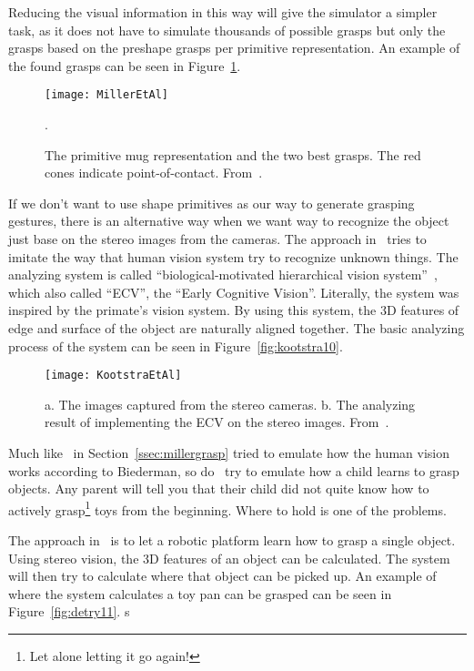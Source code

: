 Reducing the visual information in this way will give the simulator a simpler task,
as it does not have to simulate thousands of possible grasps but only the grasps based on the preshape grasps per primitive representation.
An example of the found grasps can be seen in Figure~\ref{fig:miller6}.

\begin{figure}
	\centering
	\texttt{[image: MillerEtAl]}
	\caption{The primitive mug representation and the two best grasps. The red cones indicate point-of-contact. From~\cite{miller}.}
\label{fig:miller6}.
\end{figure}

If we don’t want to use shape primitives as our way to generate grasping gestures, there is an alternative way when we want way to recognize the object just base on the stereo images from the cameras. The approach in~\cite{kootstra} tries to imitate the way that human vision system try to recognize unknown things. The analyzing system is called “biological-motivated hierarchical vision system”~\cite{pugeault}, which also called “ECV”, the “Early Cognitive Vision”. Literally, the system was inspired by the primate’s vision system. By using this system, the 3D features of edge and surface of the object are naturally aligned together. The basic analyzing process of the system can be seen in Figure~\vref{fig:kootstra10}. 

\begin{figure}
	\centering
	\texttt{[image: KootstraEtAl]}
	\caption{a. The images captured from the stereo cameras. b. The analyzing result of implementing the ECV on the stereo images. From~\cite{kootstra}.}
	\label{fig:kootstra10}
\end{figure}

Much like~\cite{miller} in Section~\ref{ssec:millergrasp} tried to emulate how the human vision works according to Biederman,
so do~\cite{detry} try to emulate how a child learns to grasp objects.
Any parent will tell you that their child did not quite know how to actively grasp\footnote{Let alone letting it go again!} toys from the beginning.
Where to hold is one of the problems.

The approach in~\cite{detry} is to let a robotic platform learn how to grasp a single object. 
Using stereo vision, the 3D features of an object can be calculated.
The system will then try to calculate where that object can be picked up.
An example of where the system calculates a toy pan can be grasped can be seen in Figure~\vref{fig:detry11}. s

